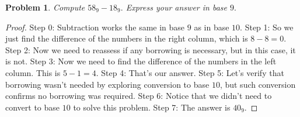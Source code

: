 \documentclass{article}
\newtheorem{theorem}{Problem}
\begin{document}
\begin{theorem}
Compute $58_9 - 18_9.$ Express your answer in base $9.$
\end{theorem}

\begin{proof}
Step 0: Subtraction works the same in base $9$ as in base $10$.
Step 1: So we just find the difference of the numbers in the right column, which is $8-8=0$.
Step 2: Now we need to reassess if any borrowing is necessary, but in this case, it is not.
Step 3: Now we need to find the difference of the numbers in the left column. This is $5-1=4$.
Step 4: That's our answer.
Step 5: Let's verify that borrowing wasn't needed by exploring conversion to base $10$, but such conversion confirms no borrowing was required.
Step 6: Notice that we didn't need to convert to base $10$ to solve this problem.
Step 7: The answer is $40_9$.
\end{proof}
\end{document}
